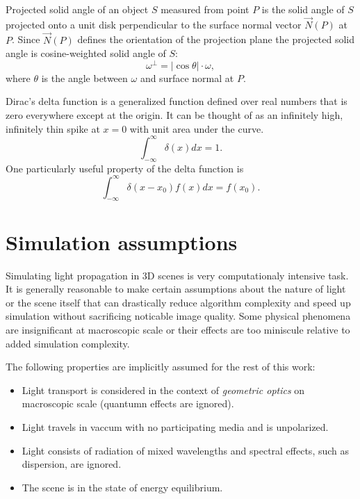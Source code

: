 \begin{df}
Projected solid angle \parencite{nicodemus76} of an object $S$ measured from point $P$ is the solid angle of $S$ projected onto a unit disk perpendicular to the surface normal vector $\vec{N}(P)$ at $P$. Since $\vec{N}(P)$ defines the orientation of the projection plane the projected solid angle is cosine-weighted solid angle of $S$:
\begin{equation}
  \omega^{\perp} = |\cos\theta| \cdot \omega ,
\end{equation}
where $\theta$ is the angle between $\omega$ and surface normal at $P$. 
\end{df}

\begin{df}
  Dirac's delta function \parencite{dirac58} is a generalized function defined over real numbers that is zero everywhere except at the origin. It can be thought of as an infinitely high, infinitely thin spike at $x=0$ with unit area under the curve.
\begin{equation}
  \int_{-\infty}^{\infty} \delta(x) dx = 1.
\end{equation}
One particularly useful property of the delta function is
\begin{equation}
  \int_{-\infty}^{\infty} \delta(x - x_{0}) f(x) dx = f(x_{0}).
\end{equation}
\end{df}

\section{Simulation assumptions}
\label{sec:assumptions}
Simulating light propagation in 3D scenes is very computationaly intensive task. It is generally reasonable to make certain assumptions about the nature of light or the scene itself that can drastically reduce algorithm complexity and speed up simulation without sacrificing noticable image quality. Some physical phenomena are insignificant at macroscopic scale or their effects are too miniscule relative to added simulation complexity.

The following properties are implicitly assumed for the rest of this work:
\begin{itemize}
\item Light transport is considered in the context of \emph{geometric optics} on macroscopic scale (quantumn effects are ignored).
\item Light travels in vaccum with no participating media and is unpolarized.
\item Light consists of radiation of mixed wavelengths and spectral effects, such as dispersion, are ignored.
\item The scene is in the state of energy equilibrium. 
\end{itemize}

